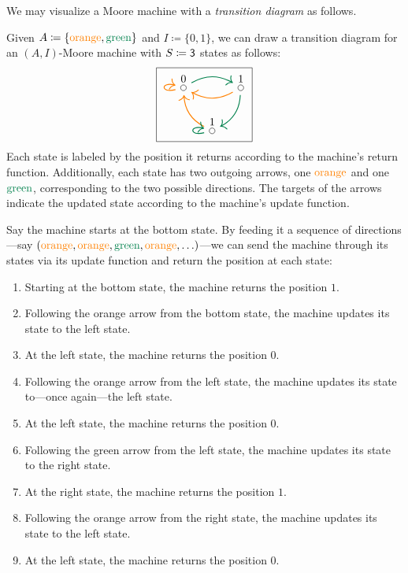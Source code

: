 \documentclass[Book-Poly]{subfiles}
\begin{document}
We may visualize a Moore machine with a \emph{transition diagram} as follows.

\begin{example}\label{ex.Moore_three}
Given $A\coloneqq\{{\color{orange}\text{orange}},{\color{dgreen}\text{green}}\}$ and $I\coloneqq\{0,1\}$, we can draw a transition diagram for an $(A,I)$-Moore machine with $S\coloneqq\textsf{3}$ states as follows:
\begin{equation} \label{eqn.trans_diag}
\begin{tikzpicture}
	\node[draw] {
  \begin{tikzcd}[column sep=small]
  	\LMO{0}\ar[rr, dgreen, thick, bend left]\ar[loop left, thick, orange]&&
  	\LMO{1}\ar[ll, thick, orange, bend left]\ar[dl, bend left, thick, dgreen]\\&
  	\LMO{1} \ar[ul, thick, orange, bend left] \ar[loop left, thick, dgreen]
  \end{tikzcd}
  };
\end{tikzpicture}
\end{equation}
Each state is labeled by the position it returns according to the machine's return function.
Additionally, each state has two outgoing arrows, one ${\color{orange}\text{orange}}$ and one ${\color{dgreen}\text{green}}$, corresponding to the two possible directions.
The targets of the arrows indicate the updated state according to the machine's update function.

Say the machine starts at the bottom state.
By feeding it a sequence of directions---say $({\color{orange}\text{orange}}, {\color{orange}\text{orange}}, {\color{dgreen}\text{green}}, {\color{orange}\text{orange}},\ldots)$---we can send the machine through its states via its update function and return the position at each state:
\begin{enumerate}
    \item Starting at the bottom state, the machine returns the position $1$.
    \item Following the {\color{orange}orange} arrow from the bottom state, the machine updates its state to the left state.
    \item At the left state, the machine returns the position $0$.
    \item Following the {\color{orange}orange} arrow from the left state, the machine updates its state to---once again---the left state.
    \item At the left state, the machine returns the position $0$.
    \item Following the {\color{dgreen}green} arrow from the left state, the machine updates its state to the right state.
    \item At the right state, the machine returns the position $1$.
    \item Following the {\color{orange}orange} arrow from the right state, the machine updates its state to the left state.
    \item At the left state, the machine returns the position $0$.


\end{enumerate}
\end{example}
\end{document}
